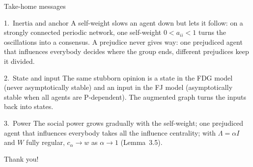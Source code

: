 \documentclass[10pt, aspectratio=169]{beamer}
\begin{document}
\begin{frame}[label=m-messages]{Take-home messages}
  \begin{alertblock}{1.\ Inertia and anchor}
    \small A self-weight slows an agent down but lets it follow: on a strongly connected
    periodic network, one self-weight $0 < a_{ii} < 1$ turns the oscillations into a
    consensus. A prejudice never gives way: one prejudiced agent that influences everybody
    decides where the group ends, different prejudices keep it divided.
  \end{alertblock}
  \begin{alertblock}{2.\ State and input}
    \small The same stubborn opinion is a state in the FDG model (never asymptotically
    stable) and an input in the FJ model (asymptotically stable when all agents are
    P-dependent). The augmented graph turns the inputs back into states.
  \end{alertblock}
  \begin{alertblock}{3.\ Power}
    \small The social power grows gradually with the self-weight; one prejudiced agent
    that influences everybody takes all the influence centrality; with
    $\Lambda = \alpha I$ and $W$ fully regular, $c_\alpha \to w$ as $\alpha \to 1$
    (Lemma~3.5).
  \end{alertblock}
\end{frame}

\begin{emptyframe}
  Thank you!
\end{emptyframe}

\appendix


\end{document}
